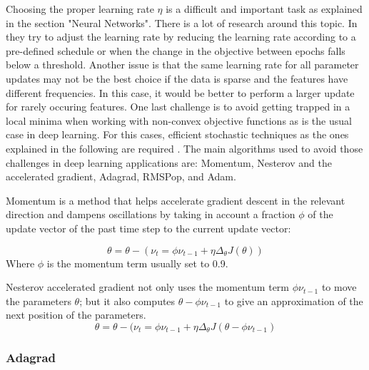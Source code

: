 Choosing the proper learning rate $\eta$ is a difficult and important task as explained in the section "Neural Networks". There is a lot of research around this topic. In \cite{robbins1951stochastic} they try to adjust the learning rate by reducing the learning rate according to a pre-defined schedule or when the change in the objective between epochs falls below a threshold. Another issue is that the same learning rate for all parameter updates may not be the best choice if the data is sparse and the features have different frequencies. In this case, it would be better to perform a larger update for rarely occuring features. One last challenge is to avoid getting trapped in a local minima when working with non-convex objective functions as is the usual case in deep learning. For this cases, efficient stochastic techniques as the ones explained in the following are required \cite{ruder2016overview}.
The main algorithms used to avoid those challenges in deep learning applications are: Momentum, Nesterov and the accelerated gradient, Adagrad, RMSPop, and Adam.

Momentum \cite{qian1999momentum} is a method that helps accelerate gradient descent in the relevant direction and dampens oscillations by taking in account a fraction $\phi$ of the update vector of the past time step to the current update vector:

\begin{equation}
\theta=\theta-(\nu_t=\phi \nu_{t-1} + \eta \Delta_\theta J(\theta))
\end{equation}
Where $\phi$ is the momentum term usually set to 0.9.


Nesterov accelerated gradient \cite{nesterov1983method} not only uses the momentum term $\phi \nu_{t-1}$  to move the parameters $\theta$; but it also computes $\theta - \phi \nu_{t-1}$ to give an approximation of the next position of the parameters.  
\begin{equation}
\theta=\theta-(\nu_t = \phi \nu_{t-1} + \eta \Delta_\theta J(\theta - \phi \nu_{t-1})
\end{equation}

\subsubsection{Adagrad}
